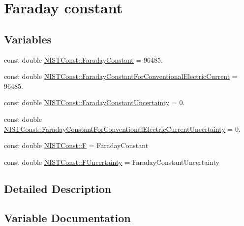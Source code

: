 \hypertarget{group___n_i_s_t_const-_faraday_constant}{}\section{Faraday constant}
\label{group___n_i_s_t_const-_faraday_constant}
\subsection*{Variables}
\begin{DoxyCompactItemize}
\item 
const double \hyperlink{group___n_i_s_t_const-_faraday_constant_ga3a2104c5d85a6e687d615ec8004aa4c5}{N\+I\+S\+T\+Const\+::\+Faraday\+Constant} = 96485.
\item 
const double \hyperlink{group___n_i_s_t_const-_faraday_constant_ga06079db2ebfcb103460b80a977171ac0}{N\+I\+S\+T\+Const\+::\+Faraday\+Constant\+For\+Conventional\+Electric\+Current} = 96485.
\item 
const double \hyperlink{group___n_i_s_t_const-_faraday_constant_ga9b0f9181caac73b346e91602673272c1}{N\+I\+S\+T\+Const\+::\+Faraday\+Constant\+Uncertainty} = 0.
\item 
const double \hyperlink{group___n_i_s_t_const-_faraday_constant_ga3b9280c2cf0f28e5ec6122b2f585eb81}{N\+I\+S\+T\+Const\+::\+Faraday\+Constant\+For\+Conventional\+Electric\+Current\+Uncertainty} = 0.
\item 
const double \hyperlink{group___n_i_s_t_const-_faraday_constant_ga16166b57bc4bad7a648fbbc660ab88eb}{N\+I\+S\+T\+Const\+::F} = Faraday\+Constant
\item 
const double \hyperlink{group___n_i_s_t_const-_faraday_constant_ga00c3ecdf32da676583d7f64f8a6a4e07}{N\+I\+S\+T\+Const\+::\+F\+Uncertainty} = Faraday\+Constant\+Uncertainty
\end{DoxyCompactItemize}


\subsection{Detailed Description}


\subsection{Variable Documentation}
\mbox{\label{group___n_i_s_t_const-_faraday_constant_ga16166b57bc4bad7a648fbbc660ab88eb}} 
